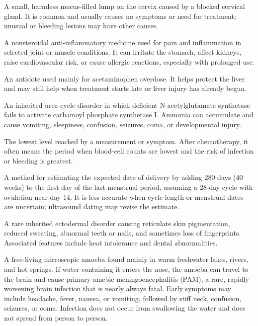  A small, harmless mucus-filled lump on the cervix caused by a blocked cervical gland. It is common and usually causes no symptoms or need for treatment; unusual or bleeding lesions may have other causes.

 A nonsteroidal anti-inflammatory medicine used for pain and inflammation in selected joint or muscle conditions. It can irritate the stomach, affect kidneys, raise cardiovascular risk, or cause allergic reactions, especially with prolonged use.

 An antidote used mainly for acetaminophen overdose. It helps protect the liver and may still help when treatment starts late or liver injury has already begun.

 An inherited urea-cycle disorder in which deficient N-acetylglutamate synthetase fails to activate carbamoyl phosphate synthetase I. Ammonia can accumulate and cause vomiting, sleepiness, confusion, seizures, coma, or developmental injury.

 The lowest level reached by a measurement or symptom. After chemotherapy, it often means the period when blood-cell counts are lowest and the risk of infection or bleeding is greatest.

 A method for estimating the expected date of delivery by adding 280 days (40 weeks) to the first day of the last menstrual period, assuming a 28-day cycle with ovulation near day 14. It is less accurate when cycle length or menstrual dates are uncertain; ultrasound dating may revise the estimate.

 A rare inherited ectodermal disorder causing reticulate skin pigmentation, reduced sweating, abnormal teeth or nails, and sometimes loss of fingerprints. Associated features include heat intolerance and dental abnormalities.

 A free-living microscopic amoeba found mainly in warm freshwater lakes, rivers, and hot springs. If water containing it enters the nose, the amoeba can travel to the brain and cause primary amebic meningoencephalitis (PAM), a rare, rapidly worsening brain infection that is nearly always fatal. Early symptoms may include headache, fever, nausea, or vomiting, followed by stiff neck, confusion, seizures, or coma. Infection does not occur from swallowing the water and does not spread from person to person.

